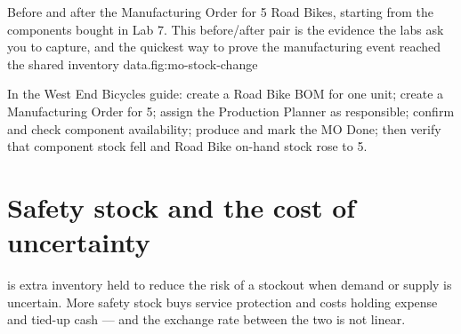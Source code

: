 \begin{utpfig}{Before and after the
Manufacturing Order for 5 Road Bikes, starting from the components bought in Lab 7.
This before/after pair is the evidence the labs ask you to capture, and the quickest way to prove the manufacturing event
reached the shared inventory data.}{fig:mo-stock-change}
\end{utpfig}

\begin{applicationbox}
In the West End Bicycles guide: create a Road Bike BOM for one unit; create a
Manufacturing Order for 5; assign the Production Planner as responsible; confirm
and check component availability; produce and mark the MO Done; then verify that
component stock fell and Road Bike on-hand stock rose to 5.
\end{applicationbox}

\section{Safety stock and the cost of uncertainty}

 is extra inventory held to reduce the risk of a stockout
when demand or supply is uncertain. More safety stock buys service protection
and costs holding expense and tied-up cash --- and the exchange rate between the
two is not linear.

